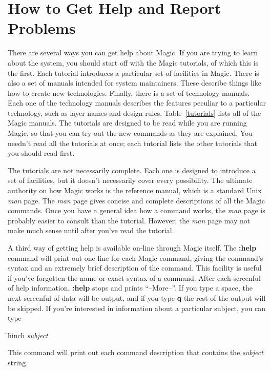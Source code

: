 \documentclass[letterpaper,twoside,12pt]{article}
\def\hinch{\hspace*{0.5in}}
\def\starti{\begin{center}\begin{tabbing}\hinch\=\hinch\=\hinch\=hinch\hinch\=\kill}
\def\endi{\end{tabbing}\end{center}}
\def\ii{\>\>\>}
\begin{document}
\section{How to Get Help and Report Problems}

There are several ways you can get help about Magic.
If you are trying to learn about the system, you should start
off with the Magic tutorials, of which this is the first.
Each tutorial introduces a particular set of facilities in Magic.
There is also a set of manuals intended for system maintainers.
These describe things like how to create new technologies.
Finally, there is a set of technology manuals.  Each one of
the technology manuals describes the features peculiar to
a particular technology, such as layer names and design rules.
Table~\ref{tutorials} lists all of the Magic manuals.
The tutorials are designed to be read while you are running Magic,
so that you can try out the new commands as they are explained.
You needn't read all the tutorials at once;  each tutorial
lists the other tutorials that you should read first.

The tutorials are not necessarily complete.  Each one
is designed to introduce a set of facilities, but it doesn't
necessarily cover every possibility.  The ultimate authority
on how Magic works is the reference manual, which is a standard
Unix {\itshape man} page.  The {\itshape man} page gives concise
and complete descriptions of all the Magic commands.
Once you have a general idea how a command works, the {\itshape man}
page is probably easier to consult than the tutorial.  However,
the {\itshape man} page may not make much sense until after you've
read the tutorial.

A third way of getting help is available on-line through Magic
itself.  The {\bfseries :help} command will print
out one line for each Magic command, giving the command's syntax
and an extremely brief description of the command.
This facility is useful if you've forgotten the name or exact
syntax of a command.  After each
screenful of help information, {\bfseries :help} stops and prints ``--More--''.
If you type a space, the next screenful of data will be output, and
if you type {\bfseries q} the rest of the output will be skipped.
If you're interested in information about a particular subject,
you can type

\starti
   \ii {\bfseries :help} {\itshape subject}
\endi

This command will print out each command description that
contains the {\itshape subject} string.
\end{document}
